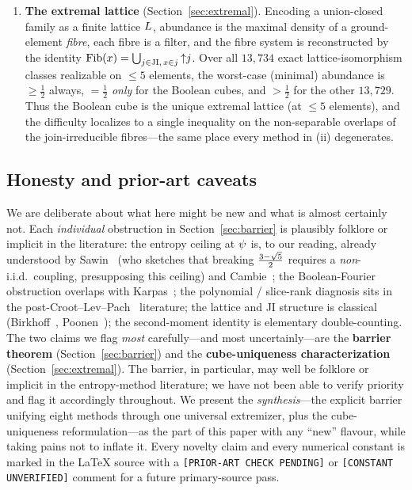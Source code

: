 \documentclass[11pt]{amsart}
\theoremstyle{definition}
\theoremstyle{remark}
\begin{document}
\begin{enumerate}[label=(\roman*),leftmargin=2.2em]
\item \textbf{The extremal lattice} (Section~\ref{sec:extremal}). Encoding a
union-closed family as a finite lattice $L$, abundance is the maximal density
of a ground-element \emph{fibre}, each fibre is a filter, and the fibre system is
reconstructed by the identity $\mathrm{Fib}(x)=\bigcup_{j\in\mathrm{JI},\,x\in j}{\uparrow}j$. Over
all $13{,}734$ exact lattice-isomorphism classes realizable on $\le 5$ elements,
the worst-case (minimal) abundance is $\ge\tfrac12$ always, $=\tfrac12$
\emph{only} for the Boolean cubes, and $>\tfrac12$ for the other $13{,}729$. Thus
the Boolean cube is the unique extremal lattice (at $\le 5$ elements), and the
difficulty localizes to a single inequality on the non-separable overlaps of the
join-irreducible fibres---the same place every method in (ii) degenerates.
\end{enumerate}

\subsection{Honesty and prior-art caveats}
We are deliberate about what here might be new and what is almost certainly not.
Each \emph{individual} obstruction in Section~\ref{sec:barrier} is plausibly
folklore or implicit in the literature: the entropy ceiling at $\psi$ is, to our
reading, already understood by Sawin~\cite{sawin2022} (who sketches that breaking
$\tfrac{3-\sqrt{5}}{2}$ requires a \emph{non}-i.i.d.\ coupling, presupposing this ceiling) and
Cambie~\cite{cambie2023}; the Boolean-Fourier obstruction overlaps with
Karpas~\cite{karpas2017}; the polynomial / slice-rank diagnosis sits in the
post-Croot--Lev--Pach~\cite{clp2017,ellenberggijswijt2017,tao2016sliceblog}
literature; the lattice and JI structure is classical
(Birkhoff~\cite{birkhoff1937}, Poonen~\cite{poonen1992}); the second-moment
identity is elementary double-counting. The two claims we flag \emph{most}
carefully---and most uncertainly---are the \textbf{barrier theorem}
(Section~\ref{sec:barrier}) and the \textbf{cube-uniqueness characterization}
(Section~\ref{sec:extremal}). The barrier, in particular, may well be folklore or
implicit in the entropy-method literature; we have not been able to verify
priority and flag it accordingly throughout. We present the \emph{synthesis}---the
explicit barrier unifying eight methods through one universal extremizer, plus the
cube-uniqueness reformulation---as the part of this paper with any ``new'' flavour,
while taking pains not to inflate it. Every novelty claim and every numerical
constant is marked in the \LaTeX{} source with a \texttt{[PRIOR-ART CHECK PENDING]}
or \texttt{[CONSTANT UNVERIFIED]} comment for a future primary-source pass.
\end{document}
